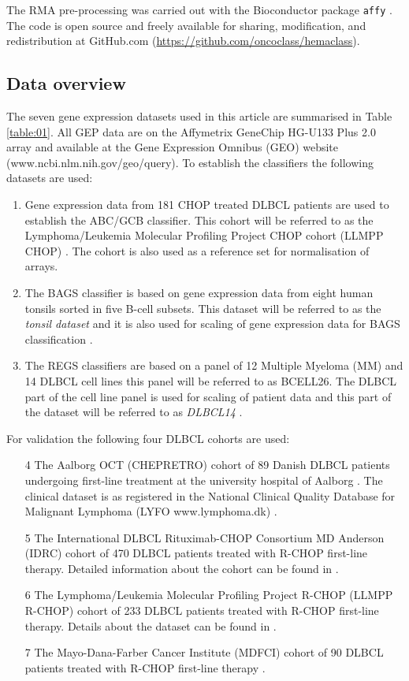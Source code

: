 \documentclass{article}
\begin{document}
The RMA pre-processing was carried out with the Bioconductor package \texttt{affy} \citep{Gautier2004}.
The code is open source and freely available for sharing, modification, and redistribution at GitHub.com (\url{https://github.com/oncoclass/hemaclass}).

\subsection{Data overview}
The seven gene expression datasets used in this article are summarised in Table \ref{table:01}.
All GEP data are on the Affymetrix GeneChip HG-U133 Plus 2.0 array and available at the Gene Expression Omnibus (GEO) website (www.ncbi.nlm.nih.gov/geo/query).
To establish the classifiers the following datasets are used:
\begin{enumerate}
  \item Gene expression data from 181 CHOP treated DLBCL patients are used to establish the ABC/GCB classifier.
  This cohort will be referred to as the Lymphoma/Leukemia Molecular Profiling Project CHOP cohort (LLMPP CHOP) \citep{Lenz2008a}.
  The cohort is also used as a reference set for normalisation of arrays.
  \item The BAGS classifier is based on gene expression data from eight human tonsils sorted in five B-cell subsets.
  This dataset will be referred to as the \textit{tonsil dataset} and it is also used for scaling of gene expression data for BAGS classification \citep{Dybkaer2013}.
  \item The REGS classifiers are based on a panel of 12 Multiple Myeloma (MM) and 14 DLBCL cell lines this panel will be referred to as BCELL26.
  The DLBCL part of the cell line panel is used for scaling of patient data and this part of the dataset will be referred to as \textit{DLBCL14} \citep{Falgreen2013c}.
\end{enumerate}
For validation the following four DLBCL cohorts are used:
\begin{enumerate}
  \item[4] The Aalborg OCT (CHEPRETRO) cohort of 89 Danish DLBCL patients undergoing first-line treatment at the university  hospital of Aalborg \citep{Dybkaer2013}.
  The clinical dataset is as registered in the National Clinical Quality Database for Malignant Lymphoma (LYFO www.lymphoma.dk) \citep{Gang2012}.
  \item[5] The International DLBCL Rituximab-CHOP Consortium MD Anderson (IDRC) cohort of 470 DLBCL patients treated with R-CHOP first-line therapy.
  Detailed information about the cohort can be found in \citep{Visco2012}.
  \item[6] The Lymphoma/Leukemia Molecular Profiling Project R-CHOP (LLMPP R-CHOP) cohort of 233 DLBCL patients treated with R-CHOP first-line therapy.
  Details about the dataset can be found in \citep{Lenz2008a}.
  \item[7] The Mayo-Dana-Farber Cancer Institute (MDFCI) cohort of 90 DLBCL patients treated with R-CHOP first-line therapy \citep{Monti2012a}.
\end{enumerate}
\end{document}
